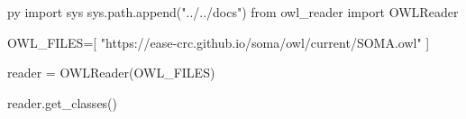 \documentclass{article}
\begin{document}
\begin{pythontexcustomcode}{py}
import sys
sys.path.append("../../docs")
from owl_reader import OWLReader

OWL_FILES=[
    "https://ease-crc.github.io/soma/owl/current/SOMA.owl"
]

reader = OWLReader(OWL_FILES)
\end{pythontexcustomcode}

\begin{multicols}{2}

\begin{pycode}
reader.get_classes()
\end{pycode}

\end{multicols}
\end{document}
